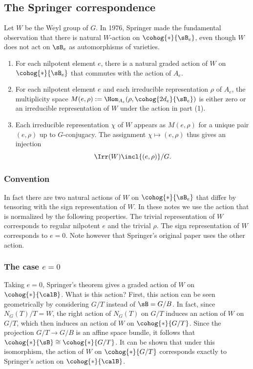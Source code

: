\subsection{The Springer correspondence}\label{ss:Spr corr} Let $W$ be the Weyl group of $G$. In 1976, Springer \cite{Springer} made the fundamental observation that there is natural $W$-action on $\cohog{*}{\sB_{e}}$, even though $W$ does not act on $\sB_{e}$ as automorphisms of varieties. 


\begin{theorem}\label{th:Spr corr} 
\begin{enumerate}
\item For each nilpotent element $e$, there is a natural graded action of $W$ on $\cohog{*}{\sB_{e}}$ that commutes with the action of $A_{e}$.
\item For each nilpotent element $e$ and each irreducible representation $\rho$ of $A_{e}$, the multiplicity space $M(e,\rho):=\Hom_{A_{e}}(\rho, \cohog{2d_{e}}{\sB_{e}})$ is either zero or an irreducible representation of $W$ under the action in part (1).
\item Each irreducible representation $\chi$ of $W$ appears as $M(e,\rho)$ for a unique pair $(e,\rho)$ up to $G$-conjugacy. The assignment $\chi\mapsto (e,\rho)$ thus gives an injection
\begin{equation}\label{Spr corr}
\Irr(W)\incl \{(e,\rho)\}/G.
\end{equation}
\end{enumerate}
\end{theorem}

\subsubsection{Convention}\label{sss:two actions} In fact there are two natural actions of $W$ on $\cohog{*}{\sB_{e}}$ that differ by tensoring with the sign representation of $W$. In these notes we use the action that is normalized by the following properties. The trivial representation of $W$ corresponds to regular nilpotent $e$ and the trivial $\rho$. The sign representation of $W$ corresponds to $e=0$. Note however that Springer's original paper \cite{Springer} uses the other action.

\subsubsection{The case $e=0$} Taking $e=0$, Springer's theorem gives a graded action of $W$ on $\cohog{*}{\calB}$. What is this action? First, this action can be seen geometrically by considering $G/T$ instead of $\sB=G/B$. In fact, since $N_{G}(T)/T=W$, the right action of $N_{G}(T)$ on $G/T$ induces an action of $W$ on $G/T$, which then induces an action of $W$ on $\cohog{*}{G/T}$. Since the projection $G/T\to G/B$ is an affine space bundle, it follows that $\cohog{*}{\sB}\cong\cohog{*}{G/T}$. It can be shown that under this isomorphism, the action of $W$ on $\cohog{*}{G/T}$ corresponds exactly to Springer's action on $\cohog{*}{\calB}$.

